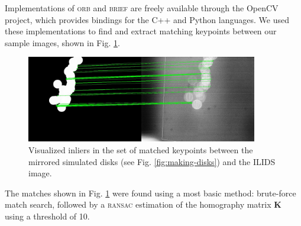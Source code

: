 \documentclass[preprint]{elsarticle}
\begin{document}
Implementations of \textsc{orb} and \textsc{brief} are freely available through
the OpenCV project, which provides bindings for the C++ and Python languages. We
used these implementations to find and extract matching keypoints between our
sample images, shown in Fig. \ref{fig:matching}.

\begin{figure}
    \centering
    \includegraphics[width=0.9\textwidth]{orb_images/asift-matching.jpg}
    \caption{Visualized inliers in the set of matched keypoints between the
    mirrored simulated disks (see Fig. \ref{fig:making-disks}) and the ILIDS image. \label{fig:matching}}
\end{figure}

The matches shown in Fig. \ref{fig:matching} were found using a most basic
method: brute-force match search, followed by a \textsc{ransac} estimation of the
homography matrix $\mathbf{K}$ using a threshold of 10.
\end{document}
